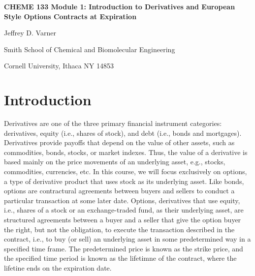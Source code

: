 \documentclass[11pt]{article}
\theoremstyle{definition}
\begin{document}
{\par\centering\textbf{\Large CHEME 133 Module 1: Introduction to Derivatives and European Style Options Contracts at Expiration}}
\vspace{0.2in}
{\par \centering \large{Jeffrey D. Varner}}
\vspace{0.05in}
{\par \centering \large{Smith School of Chemical and Biomolecular Engineering}}
{\par \centering \large{Cornell University, Ithaca NY 14853}}

\date{}
\thispagestyle{empty}

\setcounter{page}{1}

\section*{Introduction}

Derivatives are one of the three primary financial instrument categories: derivatives, equity (i.e., shares of stock), and debt (i.e., bonds and mortgages). 
Derivatives provide payoffs that depend on the value of other assets, such as commodities, bonds, stocks, or market indexes. 
Thus, the value of a derivative is based mainly on the price movements of an underlying asset, e.g., stocks, commodities, currencies, etc. 
In this course, we will focus exclusively on options, a type of derivative product that uses stock as its underlying asset. 
Like bonds, options are contractural agreements between buyers and sellers to conduct a particular transaction at some later date. 
Options, derivatives that use equity, i.e., shares of a stock or an exchange-traded fund, as their underlying asset, 
are structured agreements between a buyer and a seller that give the option buyer the right, but not the obligation, 
to execute the transaction described in the contract, i.e., to buy (or sell) an underlying asset in some predetermined way in a specified time frame. 
The predetermined price is known as the strike price, and the specified time period is known as the lifetimne of the contract, where the lifetine ends on the expiration date. 
\end{document}
